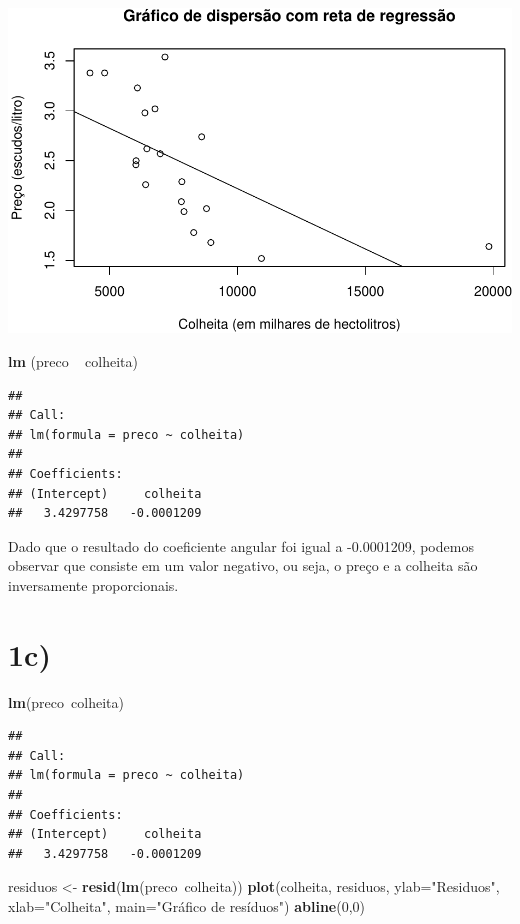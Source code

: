 \documentclass[11pt,]{article}
\makeatletter
\newenvironment{Shaded}{\begin{snugshade}}{\end{snugshade}}
\newcommand{\KeywordTok}[1]{\textcolor[rgb]{0.13,0.29,0.53}{\textbf{{#1}}}}
\newcommand{\DataTypeTok}[1]{\textcolor[rgb]{0.13,0.29,0.53}{{#1}}}
\newcommand{\DecValTok}[1]{\textcolor[rgb]{0.00,0.00,0.81}{{#1}}}
\newcommand{\StringTok}[1]{\textcolor[rgb]{0.31,0.60,0.02}{{#1}}}
\newcommand{\NormalTok}[1]{{#1}}
\def\maxwidth{\ifdim\Gin@nat@width>\linewidth\linewidth
\else\Gin@nat@width\fi}
\let\Oldincludegraphics\includegraphics
\renewcommand{\includegraphics}[1]{\Oldincludegraphics[width=\maxwidth]{#1}}
\makeatother
\begin{document}
\includegraphics{versaofinal_lista3_files/figure-latex/unnamed-chunk-4-1.pdf}

\begin{Shaded}
\begin{Highlighting}[]
\KeywordTok{lm} \NormalTok{(preco ~}\StringTok{ }\NormalTok{colheita)}
\end{Highlighting}
\end{Shaded}

\begin{verbatim}
## 
## Call:
## lm(formula = preco ~ colheita)
## 
## Coefficients:
## (Intercept)     colheita  
##   3.4297758   -0.0001209
\end{verbatim}

Dado que o resultado do coeficiente angular foi igual a -0.0001209,
podemos observar que consiste em um valor negativo, ou seja, o preço e a
colheita são inversamente proporcionais.

\section{1c)}\label{c}

\begin{Shaded}
\begin{Highlighting}[]
\KeywordTok{lm}\NormalTok{(preco~colheita)}
\end{Highlighting}
\end{Shaded}

\begin{verbatim}
## 
## Call:
## lm(formula = preco ~ colheita)
## 
## Coefficients:
## (Intercept)     colheita  
##   3.4297758   -0.0001209
\end{verbatim}

\begin{Shaded}
\begin{Highlighting}[]
\NormalTok{residuos <-}\StringTok{ }\KeywordTok{resid}\NormalTok{(}\KeywordTok{lm}\NormalTok{(preco~colheita))}
\KeywordTok{plot}\NormalTok{(colheita, residuos,}
     \DataTypeTok{ylab=}\StringTok{"Residuos"}\NormalTok{,}
     \DataTypeTok{xlab=}\StringTok{"Colheita"}\NormalTok{,}
     \DataTypeTok{main=}\StringTok{"Gráfico de resíduos"}\NormalTok{) }
\KeywordTok{abline}\NormalTok{(}\DecValTok{0}\NormalTok{,}\DecValTok{0}\NormalTok{)}
\end{Highlighting}
\end{Shaded}
\end{document}
